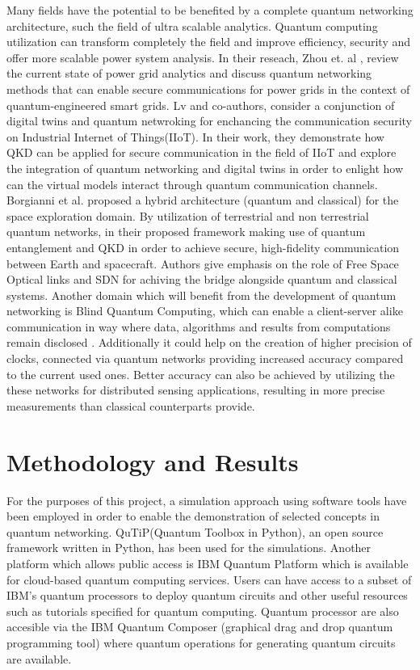 \documentclass[12pt]{ieeetj}
\begin{document}
		Many fields have the potential to be benefited by a complete quantum networking architecture, 
		such the field of ultra scalable analytics. Quantum computing utilization can transform completely
		the field and improve efficiency, security and offer more scalable power system analysis.
		In their reseach, Zhou et. al \cite{powergrid}, review the current state of power grid analytics 
		and discuss quantum networking methods that can enable secure communications for power grids 
		in the context of quantum-engineered smart grids.
		Lv and co-authors\cite{digital-twins}, consider a conjunction of digital twins and quantum netwroking for enchancing the
		communication security on Industrial Internet of Things(IIoT). In their work, they demonstrate how QKD can be applied
		for secure communication in the field of IIoT and explore the integration of quantum networking and digital twins in order
		to enlight how can the virtual models interact through quantum communication channels.
		Borgianni et al.\cite{space} proposed a hybrid architecture (quantum and classical) for the space exploration domain. 
		By utilization of terrestrial and non terrestrial quantum networks, 
		in their proposed framework making use of quantum entanglement and QKD in order to achieve secure,
		high-fidelity communication between Earth and spacecraft. 
		Authors give emphasis on the role of Free Space Optical links and SDN for achiving the 
		bridge alongside quantum and classical systems. 
		Another domain which will benefit from the development of quantum networking is Blind Quantum Computing,
		which can enable a client-server alike communication in way where data, algorithms and results from computations remain
		disclosed \cite{cisco}. Additionally it could help on the creation of higher precision of clocks, connected via quantum networks
		providing increased accuracy compared to the current used ones. Better accuracy can also be achieved by utilizing the these networks
		for distributed sensing applications, resulting in more precise measurements than classical counterparts provide.
		

	\section{Methodology and Results}
		
		For the purposes of this project, a
		simulation approach using software tools
		have been employed in order to enable the
		demonstration of selected concepts in quantum networking.
		QuTiP(Quantum Toolbox in Python)\cite{qutip}, an open source framework
		written in Python, has been used for the simulations.
		Another platform which allows public access is IBM Quantum Platform\cite{qiskit} which is available for cloud-based quantum computing services. 
		Users can have access to a subset of IBM's quantum processors to deploy quantum circuits 
		and other useful resources such as tutorials specified for quantum computing. Quantum processor are also accesible via the
		IBM Quantum Composer (graphical drag and drop quantum programming tool) where quantum operations for generating quantum circuits 
		are available.
\end{document}
